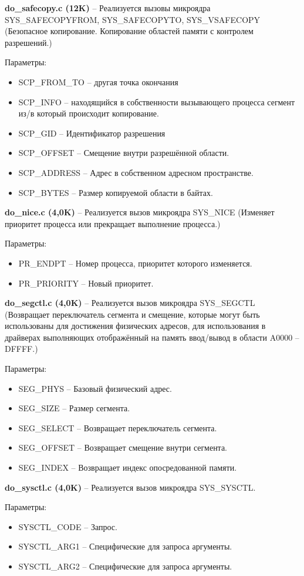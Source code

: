 \textbf{do\_safecopy.c (12K)} -- Реализуется вызовы микроядра SYS\_SAFECOPYFROM, SYS\_SAFECOPYTO, SYS\_VSAFECOPY (Безопасное копирование. Копирование областей памяти с контролем разрешений.)

Параметры:
\begin{itemize}
\item SCP\_FROM\_TO -- другая точка окончания
\item SCP\_INFO -- находящийся в собственности вызывающего процесса сегмент из/в который происходит копирование.
\item SCP\_GID -- Идентификатор разрешения
\item SCP\_OFFSET -- Смещение внутри разрешённой области.
\item SCP\_ADDRESS -- Адрес в собственном адресном пространстве.
\item SCP\_BYTES -- Размер копируемой области в байтах.
\end{itemize}

\textbf{do\_nice.c (4,0K)} -- Реализуется вызов микроядра SYS\_NICE (Изменяет приоритет процесса или прекращает выполнение процесса.)

Параметры:
\begin{itemize}
\item PR\_ENDPT -- Номер процесса, приоритет которого изменяется.
\item PR\_PRIORITY -- Новый приоритет.
\end{itemize}

\textbf{do\_segctl.c (4,0K)} -- Реализуется вызов микроядра SYS\_SEGCTL (Возвращает переключатель сегмента и смещение, которые могут быть использованы для достижения физических адресов, для использования в драйверах выполняющих отображённый на память ввод/вывод в области A0000 – DFFFF.)

Параметры:
\begin{itemize}
\item SEG\_PHYS -- Базовый физический адрес.
\item SEG\_SIZE -- Размер сегмента.
\item SEG\_SELECT -- Возвращает переключатель сегмента.
\item SEG\_OFFSET -- Возвращает смещение внутри сегмента.
\item SEG\_INDEX -- Возвращает индекс опосредованной памяти.
\end{itemize}

\textbf{do\_sysctl.c (4,0K)} -- Реализуется вызов микроядра SYS\_SYSCTL.

Параметры:
\begin{itemize}
\item SYSCTL\_CODE -- Запрос.
\item SYSCTL\_ARG1 -- Специфические для запроса аргументы.
\item SYSCTL\_ARG2 -- Специфические для запроса аргументы.
\end{itemize}

